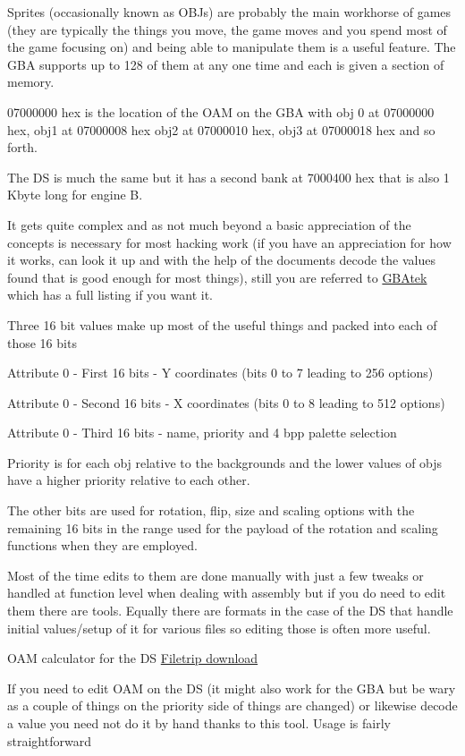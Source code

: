 \documentclass[
]{book}
\begin{document}
Sprites (occasionally known as OBJs) are probably the main workhorse of games (they are typically the things you move, the game moves and you spend most of the game focusing on) and being able to manipulate them is a useful feature. The GBA supports up to 128 of them at any one time and each is given a section of memory.

07000000 hex is the location of the OAM on the GBA with obj 0 at 07000000 hex, obj1 at 07000008 hex obj2 at 07000010 hex, obj3 at 07000018 hex and so forth.

The DS is much the same but it has a second bank at 7000400 hex that is also 1 Kbyte long for engine B.

It gets quite complex and as not much beyond a basic appreciation of the concepts is necessary for most hacking work (if you have an appreciation for how it works, can look it up and with the help of the documents decode the values found that is good enough for most things), still you are referred to \href{http://problemkaputt.de/gbatek.htm\#lcdobjoamattributes}{GBAtek} which has a full listing if you want it.

Three 16 bit values make up most of the useful things and packed into each of those 16 bits

Attribute 0 - First 16 bits - Y coordinates (bits 0 to 7 leading to 256 options)

Attribute 0 - Second 16 bits - X coordinates (bits 0 to 8 leading to 512 options)

Attribute 0 - Third 16 bits - name, priority and 4 bpp palette selection

Priority is for each obj relative to the backgrounds and the lower values of objs have a higher priority relative to each other.

The other bits are used for rotation, flip, size and scaling options with the remaining 16 bits in the range used for the payload of the rotation and scaling functions when they are employed.

Most of the time edits to them are done manually with just a few tweaks or handled at function level when dealing with assembly but if you do need to edit them there are tools. Equally there are formats in the case of the DS that handle initial values/setup of it for various files so editing those is often more useful.

OAM calculator for the DS \href{http://filetrip.net/nds-downloads/utilities/download-oam-calculator-10-f29054.html}{Filetrip download}

If you need to edit OAM on the DS (it might also work for the GBA but be wary as a couple of things on the priority side of things are changed) or likewise decode a value you need not do it by hand thanks to this tool. Usage is fairly straightforward
\end{document}
